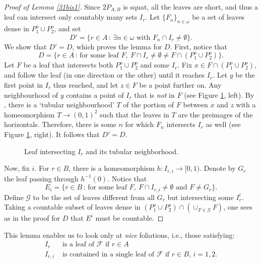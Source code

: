 \documentclass{amsart}
\begin{document}
\begin{proof}[Proof of Lemma \ref{31bis1}] Since $2P_{A,B}$ is squat, all the leaves are short, and thus a leaf can intersect only countably many sets $I_r$. Let $\{F_n\}_{n\in\omega}$ be a set of leaves dense in $P^o_1\cup P^o_2$, and set
$$
  D'=\{r\in A\,:\,\exists n\in\omega
  \textrm{ with }F_n\cap I_r\not=\emptyset\}.
$$
We show that $D'=D$, which proves the lemma for $D$. First, notice that
$$
  D=\{r\in A\,:\, \textrm{for some leaf }F,\ F\cap I_r\not=\emptyset\not=F\cap (P^o_1\cup P^o_2)\}.
$$
Let $F$ be a leaf that intersects both $P^o_1\cup P^o_2$ and some $I_r$. Fix $x\in F\cap (P^o_1\cup P^o_2)$, and follow the leaf (in one direction or the other) until it reaches $I_r$. Let $y$ be the first point in $I_r$ thus reached, and let $z\in F$ be a point further on. Any neighbourhood of $y$ contains a point of $I_r$ that is {\em not} in $F$ (see Figure \ref{figureI_r}, left). By \cite[Lemma 2.3]{BGG}, there is a `tubular neighbourhood' $T$ of the portion of $F$ between $x$ and $z$ with a homeomorphism $T\to(0,1)^2$ such that the leaves in $T$ are the preimages of the horizontals. Therefore, there is some $n$ for which $F_n$ intersects $I_r$ as well (see Figure \ref{figureI_r}, right). It follows that $D'=D$.

\begin{figure}[h]
\centering
    \hskip 1cm
    \caption{\label{figureI_r} Leaf intersecting $I_r$ and its tubular neighborhood.}
\end{figure}

Now, fix $i$. For $r\in B$, there is a homeomorphism $h:I_{r,i}\to[0,1)$. Denote by $G_r$ the leaf passing through $h^{-1}(0)$. Notice that
$$
  E_i=\{r\in B\,:\, \textrm{for some leaf }F,\ F\cap I_{r,i}\not=\emptyset \textrm{ and }F\not= G_r\}.
$$
Define $\mathcal{G}$ to be the set of leaves different from all $G_r$ but intersecting some $I^i_r$. Taking a countable subset of leaves dense in $(P^o_1\cup P^o_2)\cap(\cup_{F\in\mathcal{G}}F)$, one sees as in the proof for $D$ that $E^i$ must be countable.
\end{proof}

This lemma enables us to look only at {\em nice} foliations, i.e., those satisfying:
\begin{align}
  I_r&\textrm{ is a leaf of $\mathcal{F}$ if }r\in A \label{IrA}\\
  I_{r,i}&\textrm{ is contained in a single leaf of $\mathcal{F}$ if }r\in B,\,i=1,2. \label{IrB}
\end{align}
\end{document}
